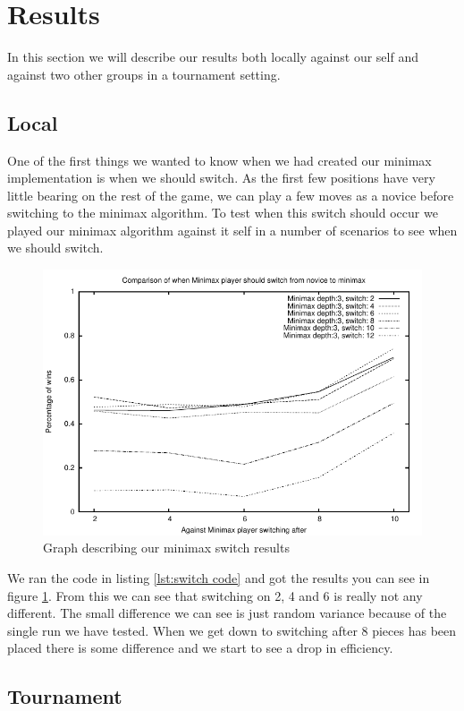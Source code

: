 \section{Results}\label{results}
In this section we will describe our results both locally against our self and
against two other groups in a tournament setting.

\subsection{Local}\label{results:local}
One of the first things we wanted to know when we had created our minimax 
implementation is when we should switch. As the first few positions have very
little bearing on the rest of the game, we can play a few moves as a novice
before switching to the minimax algorithm. To test when this switch should
occur we played our minimax algorithm against it self in a number of scenarios
to see when we should switch. 

\begin{figure}[htb]
	\includegraphics{graphs/switch.pdf}
	\caption[Minimax switch graph]{Graph describing our minimax switch results}
	\label{fig:minimax switch}
\end{figure}

We ran the code in listing \ref{lst:switch code} and got the results you can see in figure
\ref{fig:minimax switch}. From this we can see that switching on 2, 4 and 6 is 
really not any different.
The small difference we can see is just random variance because of the single
run we have tested. When we get down to switching after 8 pieces has been placed
there is some difference and we start to see a drop in efficiency.

\subsection{Tournament}\label{results:tournament}


